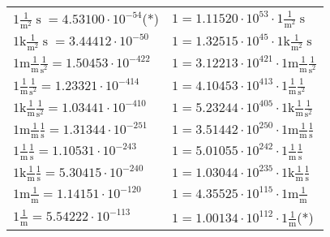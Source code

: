 \begin{center}
\begin{longtable}{l l}
{\color{black}$1 \bm{\mathrm{ }}\frac1{\operatorname{m}^2}{\operatorname{s}}{}{} = 4.53100\cdot10^{-54} $}\quad(*) & {\color{black}$ 1 = 1.11520\cdot10^{53} \cdot 1 \bm{\mathrm{ }}\frac1{\operatorname{m}^2}{\operatorname{s}}{}{}$}  \\
{\color{gray}$1 \bm{\mathrm{ k}}\frac1{\operatorname{m}^2}{\operatorname{s}}{}{} = 3.44412\cdot10^{-50} $}   & {\color{gray}$ 1 = 1.32515\cdot10^{45} \cdot 1 \bm{\mathrm{ k}}\frac1{\operatorname{m}^2}{\operatorname{s}}{}{}$}  \\
{\color{gray}$1 \bm{\mathrm{ m}}\frac1{\operatorname{m}}\frac1{\operatorname{s}^2}{}{} = 1.50453\cdot10^{-422} $}   & {\color{gray}$ 1 = 3.12213\cdot10^{421} \cdot 1 \bm{\mathrm{ m}}\frac1{\operatorname{m}}\frac1{\operatorname{s}^2}{}{}$}  \\
{\color{black}$1 \bm{\mathrm{ }}\frac1{\operatorname{m}}\frac1{\operatorname{s}^2}{}{} = 1.23321\cdot10^{-414} $}   & {\color{black}$ 1 = 4.10453\cdot10^{413} \cdot 1 \bm{\mathrm{ }}\frac1{\operatorname{m}}\frac1{\operatorname{s}^2}{}{}$}  \\
{\color{gray}$1 \bm{\mathrm{ k}}\frac1{\operatorname{m}}\frac1{\operatorname{s}^2}{}{} = 1.03441\cdot10^{-410} $}   & {\color{gray}$ 1 = 5.23244\cdot10^{405} \cdot 1 \bm{\mathrm{ k}}\frac1{\operatorname{m}}\frac1{\operatorname{s}^2}{}{}$}  \\
{\color{gray}$1 \bm{\mathrm{ m}}\frac1{\operatorname{m}}\frac1{\operatorname{s}}{}{} = 1.31344\cdot10^{-251} $}   & {\color{gray}$ 1 = 3.51442\cdot10^{250} \cdot 1 \bm{\mathrm{ m}}\frac1{\operatorname{m}}\frac1{\operatorname{s}}{}{}$}  \\
{\color{black}$1 \bm{\mathrm{ }}\frac1{\operatorname{m}}\frac1{\operatorname{s}}{}{} = 1.10531\cdot10^{-243} $}   & {\color{black}$ 1 = 5.01055\cdot10^{242} \cdot 1 \bm{\mathrm{ }}\frac1{\operatorname{m}}\frac1{\operatorname{s}}{}{}$}  \\
{\color{gray}$1 \bm{\mathrm{ k}}\frac1{\operatorname{m}}\frac1{\operatorname{s}}{}{} = 5.30415\cdot10^{-240} $}   & {\color{gray}$ 1 = 1.03044\cdot10^{235} \cdot 1 \bm{\mathrm{ k}}\frac1{\operatorname{m}}\frac1{\operatorname{s}}{}{}$}  \\
{\color{gray}$1 \bm{\mathrm{ m}}\frac1{\operatorname{m}}{}{}{} = 1.14151\cdot10^{-120} $}   & {\color{gray}$ 1 = 4.35525\cdot10^{115} \cdot 1 \bm{\mathrm{ m}}\frac1{\operatorname{m}}{}{}{}$}  \\
{\color{black}$1 \bm{\mathrm{ }}\frac1{\operatorname{m}}{}{}{} = 5.54222\cdot10^{-113} $}   & {\color{black}$ 1 = 1.00134\cdot10^{112} \cdot 1 \bm{\mathrm{ }}\frac1{\operatorname{m}}{}{}{}$}\quad(*)\\

\end{longtable}
\end{center}
